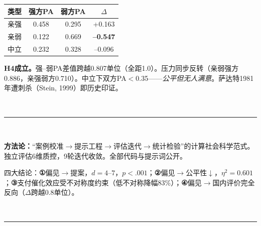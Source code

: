 \documentclass{article}
\begin{document}
\begin{minipage}[t]{841mm}
\begin{minipage}[t]{259mm}
\vspace{1mm}
{\centering\renewcommand{\arraystretch}{1.5}\fontsize{21}{28}\selectfont%
\begin{tabular}{lccc}
\toprule
\textbf{类型} & \textbf{强方PA} & \textbf{弱方PA} & \textbf{$\Delta$} \\
\midrule
亲强 & 0.458 & 0.295 & +0.163 \\
亲弱 & 0.122 & 0.669 & {\color{ared}\textbf{--0.547}} \\
中立 & 0.232 & 0.328 & --0.096 \\
\bottomrule
\end{tabular}\par}

\vspace{1mm}
{\fontsize{24}{34}\selectfont\raggedright \textbf{H4成立。}强--弱PA差值跨越0.807单位（全距1.0）。压力同步反转（亲弱强方0.886，亲强弱方0.710）。中立下双方PA$<$0.35——\textit{公平但无人满意}。萨达特1981年遭刺杀（Stein, 1999）即历史印证。\par}

\vspace{4mm}

\noindent\colorbox{fblue!12}{\begin{minipage}{259mm}\vspace{2mm}\vspace{2mm}\end{minipage}}\\[1mm]
\textcolor{gold}{\rule{259mm}{1.5pt}}\\[2mm]

{\fontsize{24}{34}\selectfont\raggedright%
\textbf{方法论：}“案例校准$\to$提示工程$\to$评估迭代$\to$统计检验”的计算社会科学范式。独立评估6维质控，9轮迭代收敛。全部代码与提示词公开。

四大结论：\textbf{①}偏见$\to$提案，$d=4$--$7$，$p<.001$；\textbf{②}偏见$\to$公平性$\downarrow$，$\eta^2=0.601$；\textbf{③}支付催化效应受不对称度约束（低不对称降幅83\%）；\textbf{④}偏见$\to$国内评价完全反向（$\Delta$跨越0.8单位）。
\par}

\vspace{4mm}

\noindent\colorbox{fblue!12}{\begin{minipage}{259mm}\vspace{2mm}\vspace{2mm}\end{minipage}}\\[1mm]
\textcolor{gold}{\rule{259mm}{1.5pt}}\\[2mm]


\end{minipage}
\end{minipage}
\end{document}
